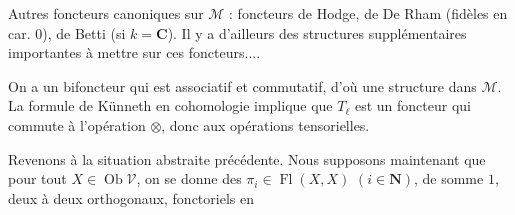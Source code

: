 Autres foncteurs canoniques sur $\mathcal M$ : foncteurs de Hodge, de  De Rham (fidèles en car. $0$), de Betti (si $k=\mathbf C$). Il y a d'ailleurs des structures supplémentaires importantes à mettre sur ces foncteurs....

On a un bifoncteur
qui est associatif et commutatif, d'où une structure  dans $\mathcal M$.
La formule de Künneth en cohomologie implique que $T_\ell$ est un foncteur qui commute  à l'opération $\otimes$, donc aux opérations tensorielles.


Revenons à la situation abstraite précédente. Nous supposons maintenant que pour tout $X\in\operatorname{Ob}\mathcal V$, on se donne des  $\pi_i\in\operatorname{Fl}(X,X)$ $(i\in\mathbf N)$,  de somme $1$, deux à deux orthogonaux, fonctoriels en
